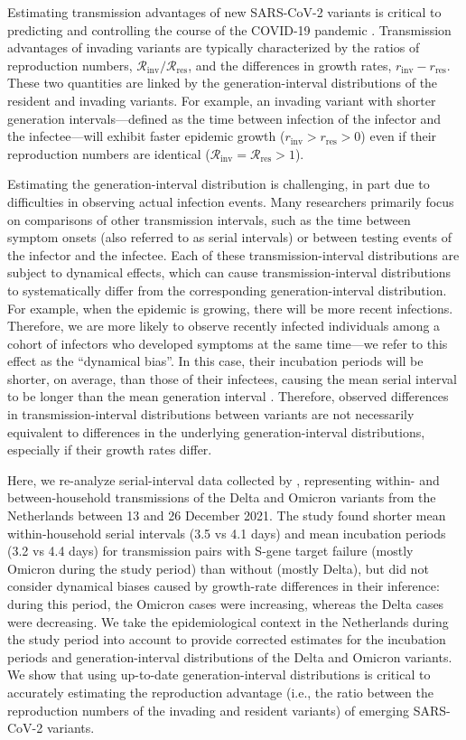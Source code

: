\documentclass[12pt]{article}
\newcommand{\Rx}[1]{\ensuremath{{\mathcal R}_{#1}}\xspace}
\newcommand{\Rres}{\Rx{\mathrm{res}}}
\newcommand{\Rinv}{\Rx{\mathrm{inv}}}
\newcommand{\rx}[1]{\ensuremath{{r}_{#1}}\xspace}
\newcommand{\rres}{\rx{\mathrm{res}}}
\newcommand{\rinv}{\rx{\mathrm{inv}}}
\begin{document}
Estimating transmission advantages of new SARS-CoV-2 variants is critical to predicting and controlling the course of the COVID-19 pandemic \citep{park2021roles}.
Transmission advantages of invading variants are typically characterized by the ratios of reproduction numbers, $\Rinv/\Rres$, and the differences in growth rates, $\rinv-\rres$.
These two quantities are linked by the generation-interval distributions of the resident and invading variants.
For example, an invading variant with shorter generation intervals---defined as the time between infection of the infector and the infectee---will exhibit faster epidemic growth ($\rinv > \rres > 0$) even if their reproduction numbers are identical ($\Rinv = \Rres > 1$).

Estimating the generation-interval distribution is challenging, in part due to difficulties in observing actual infection events.
Many researchers primarily focus on comparisons of other transmission intervals, such as the time between symptom onsets (also referred to as serial intervals) or between testing events \citep{abbott2022test} of the infector and the infectee.
Each of these transmission-interval distributions are subject to dynamical effects, which can cause transmission-interval distributions to systematically differ from the corresponding generation-interval distribution.
For example, when the epidemic is growing, there will be more recent infections. 
Therefore, we are more likely to observe recently infected individuals among a cohort of infectors who developed symptoms at the same time---we refer to this effect as the ``dynamical bias''.
In this case, their incubation periods will be shorter, on average, than those of their infectees, causing the mean serial interval to be longer than the mean generation interval \citep{park2021forward}.
Therefore, observed differences in transmission-interval distributions between variants are not necessarily equivalent to differences in the underlying generation-interval distributions, especially if their growth rates differ.

Here, we re-analyze serial-interval data collected by \citep{backer2021omicron}, representing within- and between-household transmissions of the Delta and Omicron variants from the Netherlands between 13 and 26 December 2021.
The study found shorter mean within-household serial intervals (3.5 vs 4.1 days) and mean incubation periods (3.2 vs 4.4 days) for transmission pairs with S-gene target failure (mostly Omicron during the study period) than without (mostly Delta), but did not consider dynamical biases caused by growth-rate differences in their inference:
during this period, the Omicron cases were increasing, whereas the Delta cases were decreasing.
We take the epidemiological context in the Netherlands during the study period into account to provide corrected estimates for the incubation periods and generation-interval distributions of the Delta and Omicron variants.
We show that using up-to-date generation-interval distributions is critical to accurately estimating the reproduction advantage (i.e., the ratio between the reproduction numbers of the invading and resident variants) of emerging SARS-CoV-2 variants.
\end{document}
